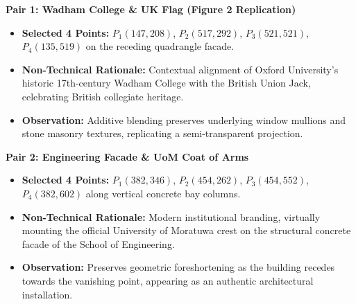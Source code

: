 \documentclass[10pt]{article}
\begin{document}
	\noindent\begin{minipage}[t]{0.48\textwidth}
		\footnotesize \textbf{Pair 1: Wadham College \& UK Flag (Figure 2 Replication)}
		\begin{itemize}[leftmargin=*, nosep]
			\item \textbf{Selected 4 Points:} $P_1(147, 208)$, $P_2(517, 292)$, $P_3(521, 521)$, $P_4(135, 519)$ on the receding quadrangle facade.
			\item \textbf{Non-Technical Rationale:} Contextual alignment of Oxford University's historic 17th-century Wadham College with the British Union Jack, celebrating British collegiate heritage.
			\item \textbf{Observation:} Additive blending preserves underlying window mullions and stone masonry textures, replicating a semi-transparent projection.
		\end{itemize}
	\end{minipage}
	\hfill
	\begin{minipage}[t]{0.48\textwidth}
		\footnotesize \textbf{Pair 2: Engineering Facade \& UoM Coat of Arms}
		\begin{itemize}[leftmargin=*, nosep]
			\item \textbf{Selected 4 Points:} $P_1(382, 346)$, $P_2(454, 262)$, $P_3(454, 552)$, $P_4(382, 602)$ along vertical concrete bay columns.
			\item \textbf{Non-Technical Rationale:} Modern institutional branding, virtually mounting the official University of Moratuwa crest on the structural concrete facade of the School of Engineering.
			\item \textbf{Observation:} Preserves geometric foreshortening as the building recedes towards the vanishing point, appearing as an authentic architectural installation.
		\end{itemize}
	\end{minipage}
\end{document}
